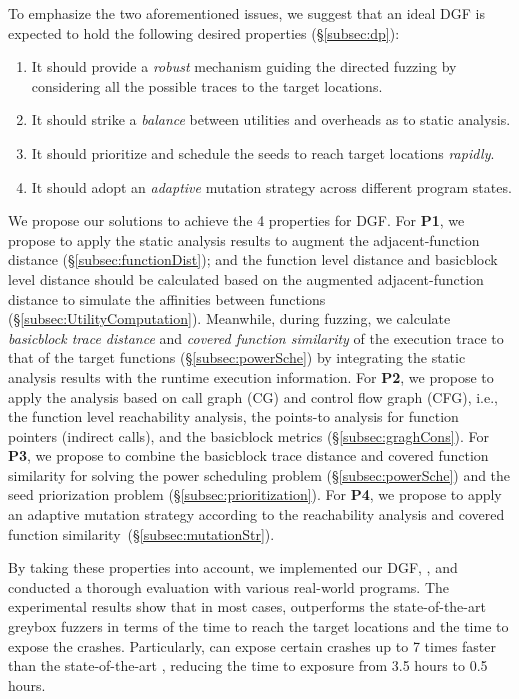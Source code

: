 To emphasize the two aforementioned issues, we suggest that an ideal DGF is expected to hold the following desired properties (\S\ref{subsec:dp}):
\begin{enumerate}[\textbf{P}1]
\itemsep0em 
\item It should provide a \emph{robust} mechanism guiding the directed fuzzing by considering all the possible traces to the target locations.
\item It should strike a \emph{balance} between utilities and overheads as to static analysis.
\item It should prioritize and schedule the seeds to reach target locations \emph{rapidly}.
\item It should adopt an \emph{adaptive} mutation strategy across different program states.
\end{enumerate}


We propose our solutions to achieve the 4 properties for DGF. 
For \textbf{P1}, we propose to apply the static analysis results to augment the adjacent-function distance (\S\ref{subsec:functionDist}); and the function level distance and basicblock level distance should be calculated based on the augmented adjacent-function distance to simulate the affinities between functions (\S\ref{subsec:UtilityComputation}).
Meanwhile, during fuzzing, we calculate \emph{basicblock trace distance} and \emph{covered function similarity} of the execution trace to that of the target functions (\S\ref{subsec:powerSche}) by integrating the static analysis results with the runtime execution information.
For \textbf{P2}, we propose to apply the analysis based on call graph (CG) and control flow graph (CFG), i.e., the function level reachability analysis, the points-to analysis for function pointers (indirect calls), and the basicblock metrics (\S\ref{subsec:graghCons}). 
For \textbf{P3}, we propose to combine the basicblock trace distance and covered function similarity for solving the power scheduling problem (\S\ref{subsec:powerSche}) and the seed priorization problem (\S\ref{subsec:prioritization}). 
For \textbf{P4}, we propose to apply an adaptive mutation strategy according to the reachability analysis and covered function similarity~(\S\ref{subsec:mutationStr}).

By taking these properties into account, we implemented our DGF, {\dFOT}, and conducted a thorough evaluation with various real-world programs. 
The experimental results show that in most cases, {\dFOT} outperforms the state-of-the-art greybox fuzzers in terms of the time to reach the target locations and the time to expose the crashes.
Particularly, {\dFOT} can expose certain crashes up to 7 times faster than the state-of-the-art \aflgo, reducing the time to exposure from 3.5 hours to 0.5 hours.

